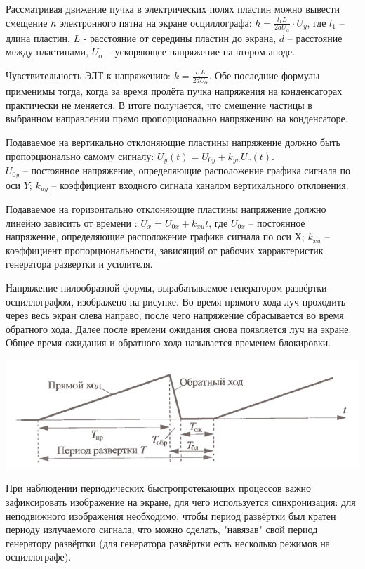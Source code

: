 \documentclass[a4paper, 12pt]{article} %
\begin{document}
Рассматривая движение пучка в электрических полях пластин можно вывести смещение $h$ электронного пятна на экране осциллографа: ${ h =\frac{l_1L}{2dU_\alpha}\cdot U_y}$, где ${ l_1}$ -- длина пластин, ${ L}$ - расстояние от середины пластин до экрана, $d$ -- расстояние между пластинами, ${ U_\alpha} $ -- ускоряющее напряжение на втором аноде.

Чувствительность ЭЛТ к напряжению: ${ k =\frac{l_1L}{2dU_\alpha}}$. Обе последние формулы применимы тогда, когда за время пролёта пучка напряжения на конденсаторах практически не меняется. В итоге получается, что смещение частицы в выбранном направлении прямо пропорционально напряжению на конденсаторе.



Подаваемое на вертикально отклоняющие пластины напряжение должно быть пропорционально самому сигналу:  ${ U_y(t) = U_{0y}+k_{yu}U_c(t).}$\\
${ U_{0y}}$ -- постоянное напряжение, определяющие расположение графика сигнала по оси $Y$; ${ k_{uy}}$ -- коэффициент входного сигнала каналом вертикального отклонения.

Подаваемое на горизонтально отклоняющие пластины напряжение должно линейно зависить от времени : ${ U_x = U_{0x}+ k_{xu}t}$, где ${ U_{0x}}$ -- постоянное напряжение, определяющие расположение графика сигнала по оси $Х$; ${ k_{xu}}$ -- коэффициент пропорциональности, зависящий от рабочих харрактеристик генератора развертки и усилителя.

Напряжение пилообразной формы, вырабатываемое генератором развёртки осциллографом, изображено на рисунке. Во время прямого хода луч проходить через весь экран слева направо, после чего напряжение сбрасывается во время обратного хода. Далее после времени ожидания снова появляется луч на экране. Общее время ожидания и обратного хода называется временем блокировки.

\begin{center}
	\includegraphics[width=14cm]{3}
\end{center}

При наблюдении периодических быстропротекающих процессов важно зафиксировать изображение на экране, для чего используется синхронизация: для неподвижного изображения необходимо, чтобы период развёртки был кратен периоду излучаемого сигнала, что можно сделать, "навязав" свой период генератору развёртки (для генератора развёртки есть несколько режимов на осциллографе).
\end{document}
